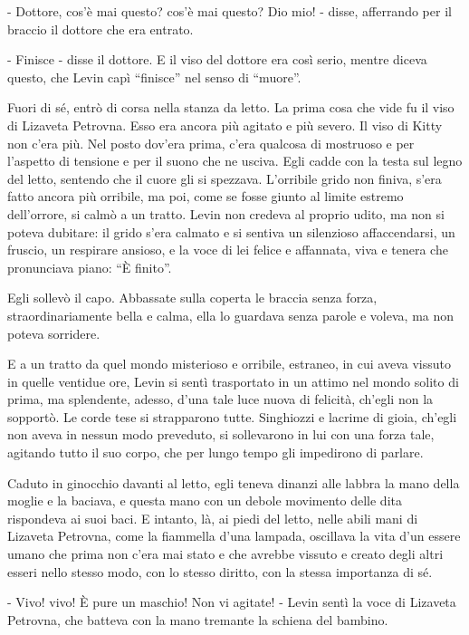 - Dottore, cos'è mai questo? cos'è mai questo? Dio mio! - disse, afferrando per il braccio il dottore che era entrato. 

- Finisce - disse il dottore. E il viso del dottore era così serio, mentre diceva questo, che Levin capì ``finisce'' nel senso di ``muore''. 

Fuori di sé, entrò di corsa nella stanza da letto. La prima cosa che vide fu il viso di Lizaveta Petrovna. Esso era ancora più agitato e più severo. Il viso di Kitty non c'era più. Nel posto dov'era prima, c'era qualcosa di mostruoso e per l'aspetto di tensione e per il suono che ne usciva. Egli cadde con la testa sul legno del letto, sentendo che il cuore gli si spezzava. L'orribile grido non finiva, s'era fatto ancora più orribile, ma poi, come se fosse giunto al limite estremo dell'orrore, si calmò a un tratto. Levin non credeva al proprio udito, ma non si poteva dubitare: il grido s'era calmato e si sentiva un silenzioso affaccendarsi, un fruscio, un respirare ansioso, e la voce di lei felice e affannata, viva e tenera che pronunciava piano: ``È finito''. 

Egli sollevò il capo. Abbassate sulla coperta le braccia senza forza, straordinariamente bella e calma, ella lo guardava senza parole e voleva, ma non poteva sorridere. 

E a un tratto da quel mondo misterioso e orribile, estraneo, in cui aveva vissuto in quelle ventidue ore, Levin si sentì trasportato in un attimo nel mondo solito di prima, ma splendente, adesso, d'una tale luce nuova di felicità, ch'egli non la sopportò. Le corde tese si strapparono tutte. Singhiozzi e lacrime di gioia, ch'egli non aveva in nessun modo preveduto, si sollevarono in lui con una forza tale, agitando tutto il suo corpo, che per lungo tempo gli impedirono di parlare. 

Caduto in ginocchio davanti al letto, egli teneva dinanzi alle labbra la mano della moglie e la baciava, e questa mano con un debole movimento delle dita rispondeva ai suoi baci. E intanto, là, ai piedi del letto, nelle abili mani di Lizaveta Petrovna, come la fiammella d'una lampada, oscillava la vita d'un essere umano che prima non c'era mai stato e che avrebbe vissuto e creato degli altri esseri nello stesso modo, con lo stesso diritto, con la stessa importanza di sé. 

- Vivo! vivo! È pure un maschio! Non vi agitate! - Levin sentì la voce di Lizaveta Petrovna, che batteva con la mano tremante la schiena del bambino. 

